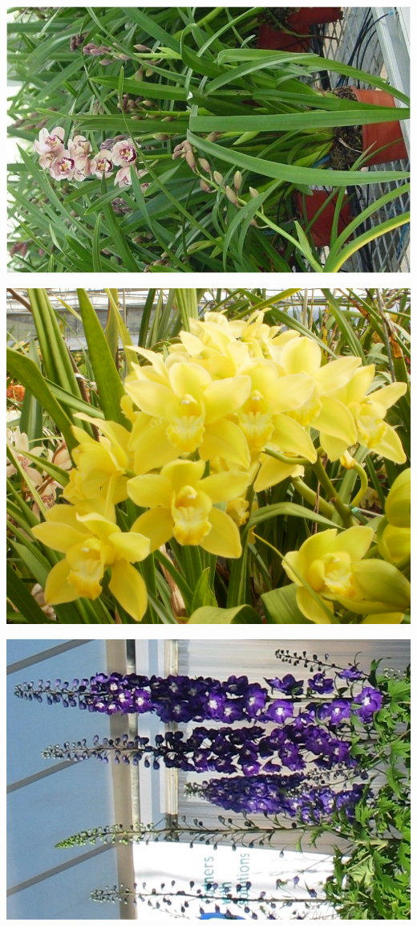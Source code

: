 \documentclass{article}
\begin{document}
\begin{center}
\includegraphics[height=0.925\paperheight]{../Cymbidium_Plant.jpg}
\end{center}
\newpage

\begin{center}
\includegraphics[height=0.925\paperheight]{../Cymbidium_Yellow.jpg}
\end{center}
\newpage

\begin{center}
\includegraphics[height=0.925\paperheight]{../Delphinium.jpg}
\end{center}
\newpage
\end{document}
